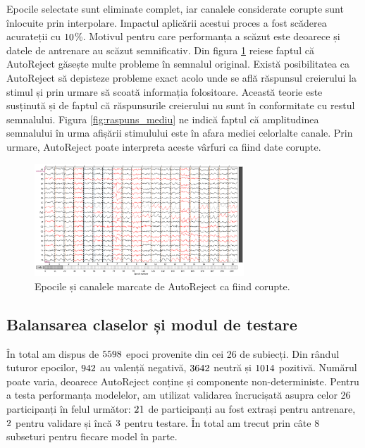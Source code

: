Epocile selectate sunt eliminate complet, iar canalele considerate corupte sunt înlocuite prin interpolare. Impactul aplicării acestui proces a fost scăderea acurateții cu $10$\%. Motivul pentru care performanța a scăzut este deoarece și datele de antrenare au scăzut semnificativ. Din figura \ref{fig:autoreject} reiese faptul că AutoReject găsește multe probleme în semnalul original. Există posibilitatea ca AutoReject să depisteze probleme exact acolo unde se află răspunsul creierului la stimul și prin urmare să scoată informația folositoare. Această teorie este susținută și de faptul că răspunsurile creierului nu sunt în conformitate cu restul semnalului. Figura \ref{fig:raspuns_mediu} ne indică faptul că amplitudinea semnalului în urma afișării stimulului este în afara mediei celorlalte canale. Prin urmare, AutoReject poate interpreta aceste vârfuri ca fiind date corupte.

\vspace{1em}
\begin{figure}[H]
    \centering
		\vspace{-1em}
    \includegraphics[width=0.7\textwidth]{images/rezultat_autoreject.png}
    \caption{Epocile și canalele marcate de AutoReject ca fiind corupte.}
		\vspace{-1em}
    \label{fig:autoreject}
\end{figure}

\subsection{Balansarea claselor și modul de testare}

În total am dispus de $5598$ epoci provenite din cei 26 de subiecți. Din rândul tuturor epocilor, $942$ au valență negativă, $3642$ neutră și $1014$ pozitivă. Numărul poate varia, deoarece AutoReject conține și componente non-deterministe. Pentru a testa performanța modelelor, am utilizat validarea încrucișată asupra celor 26 participanți în felul următor: $21$ de participanți au fost extrași pentru antrenare, $2$ pentru validare și încă $3$ pentru testare. În total am trecut prin câte 8 subseturi pentru fiecare model în parte.


